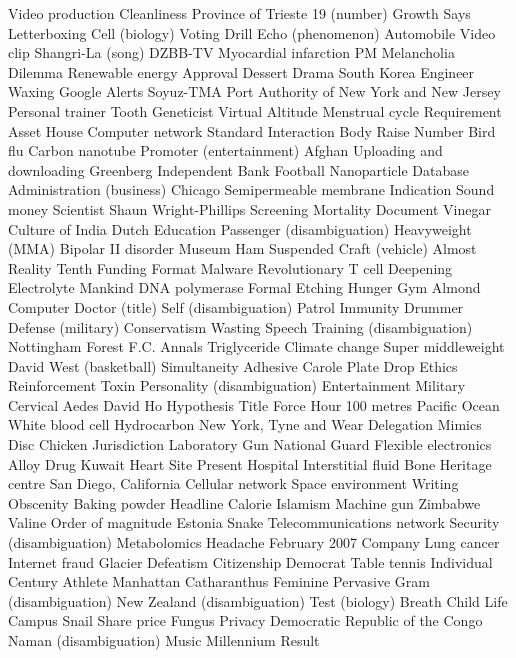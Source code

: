 Video production  Cleanliness  Province of Trieste  
19 (number)  Growth  Says  
Letterboxing  Cell (biology)  Voting  
Drill  Echo (phenomenon)  Automobile  
Video clip  Shangri-La (song)  DZBB-TV  
Myocardial infarction  PM  Melancholia  
Dilemma  Renewable energy  Approval  
Dessert  Drama  South Korea  
Engineer  Waxing  Google Alerts  
Soyuz-TMA  Port Authority of New York and New Jersey  Personal trainer  
Tooth  Geneticist  Virtual  
Altitude  Menstrual cycle  Requirement  
Asset  House  Computer network  
Standard  Interaction  Body  
Raise  Number  Bird flu  
Carbon nanotube  Promoter (entertainment)  Afghan  
Uploading and downloading  Greenberg  Independent Bank  
Football  Nanoparticle  Database  
Administration (business)  Chicago  Semipermeable membrane  
Indication  Sound money  Scientist  
Shaun Wright-Phillips  Screening  Mortality  
Document  Vinegar  Culture of India  
Dutch  Education  Passenger (disambiguation)  
Heavyweight (MMA)  Bipolar II disorder  Museum  
Ham  Suspended  Craft (vehicle)  
Almost  Reality  Tenth  
Funding  Format  Malware  
Revolutionary  T cell  Deepening  
Electrolyte  Mankind  DNA polymerase  
Formal  Etching  Hunger  
Gym  Almond  Computer  
Doctor (title)  Self (disambiguation)  Patrol  
Immunity  Drummer  Defense (military)  
Conservatism  Wasting  Speech  
Training (disambiguation)  Nottingham Forest F.C.  Annals  
Triglyceride  Climate change  Super middleweight  
David West (basketball)  Simultaneity  Adhesive  
Carole  Plate  Drop  
Ethics  Reinforcement  Toxin  
Personality (disambiguation)  Entertainment  Military  
Cervical  Aedes  David Ho  
Hypothesis  Title  Force  
Hour  100 metres  Pacific Ocean  
White blood cell  Hydrocarbon  New York, Tyne and Wear  
Delegation  Mimics  Disc  
Chicken  Jurisdiction  Laboratory  
Gun  National Guard  Flexible electronics  
Alloy  Drug  Kuwait  
Heart  Site  Present  
Hospital  Interstitial fluid  Bone  
Heritage centre  San Diego, California  Cellular network  
Space environment  Writing  Obscenity  
Baking powder  Headline  Calorie  
Islamism  Machine gun  Zimbabwe  
Valine  Order of magnitude  Estonia  
Snake  Telecommunications network  Security (disambiguation)  
Metabolomics  Headache  February 2007  
Company  Lung cancer  Internet fraud  
Glacier  Defeatism  Citizenship  
Democrat  Table tennis  Individual  
Century  Athlete  Manhattan  
Catharanthus  Feminine  Pervasive  
Gram (disambiguation)  New Zealand (disambiguation)  Test (biology)  
Breath  Child  Life  
Campus  Snail  Share price  
Fungus  Privacy  Democratic Republic of the Congo  
Naman (disambiguation)  Music Millennium  Result  
